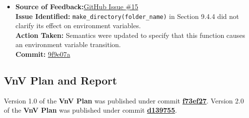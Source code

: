 \documentclass{article}
\begin{document}
\begin{itemize}
  \item \textbf{Source of Feedback:}\href{https://github.com/KiranSingh15/CAS-741-Image-Correspondences/issues/15}{GitHub Issue \#15} \\
  \textbf{Issue Identified:} \texttt{make\_directory(folder\_name)} in Section 9.4.4 did not clarify its effect on environment variables. \\
  \textbf{Action Taken:} Semantics were updated to specify that this function causes an environment variable transition. \\
  \textbf{Commit:} \href{https://github.com/KiranSingh15/CAS-741-Image-Correspondences/commit/9f9e07a572e2f0db97f3e057f998ba9bad0d9189}{9f9e07a}

\end{itemize}



\subsection{VnV Plan and Report}
\noindent Version 1.0 of the \textbf{VnV Plan} was published under commit \href{https://github.com/KiranSingh15/CAS-741-Image-Correspondences/commit/f73ef273ec0e440c47bb849f142982482d895bc0}{\textbf{f73ef27}}. Version 2.0 of the \textbf{VnV Plan} was published under commit \href{https://github.com/KiranSingh15/CAS-741-Image-Correspondences/commit/d139755d96b3c7b316cd7f96106ef69df3ab228a}{\textbf{d139755}}.\\ \\
\end{document}
